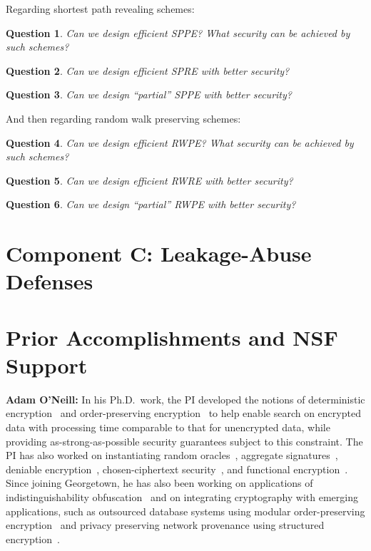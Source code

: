 \documentclass[11pt]{article}
\newtheorem{question}{Question}[section]
\theoremstyle{remark}
\begin{document}
Regarding shortest path revealing schemes: 

\begin{question}
Can we design efficient SPPE?  What security can be achieved by such schemes?
\end{question}


\begin{question}
Can we design efficient SPRE with better security?
\end{question}

\begin{question}
Can we design ``partial'' SPPE with better security?
\end{question}

And then regarding random walk preserving schemes:

\begin{question}
Can we design efficient RWPE?  What security can be achieved by such schemes?
\end{question}


\begin{question}
Can we design efficient RWRE with better security?
\end{question}

\begin{question}
Can we design ``partial'' RWPE with better security?
\end{question}




\section{Component C: Leakage-Abuse Defenses}


\section{Prior Accomplishments and NSF Support}

\textbf{Adam O'Neill:}
In his Ph.D.~work, the PI  developed the notions of deterministic encryption~\cite{C:BelBolOne07,ABO07,C:BolFehOne08,C:BFOR08,TCC:FulNeiRey12} and order-preserving encryption~\cite{EC:BCLO09,C:BolCheOne11} to help enable search on encrypted data with processing time comparable to that for unencrypted data, while providing as-strong-as-possible security guarantees subject to this constraint.
The PI has also worked on  instantiating random oracles~\cite{C:KilOneSmi10,TCC:GoyONeRao11,EC:LewONeSmi13},   aggregate signatures~\cite{CCS:BGOY07,AC:GLOW12}, deniable encryption~\cite{C:OnePeiWat11},  chosen-ciphertext security~\cite{EC:KilMohOne10,PKC:DFMO14}, and  functional encryption~\cite{EPRINT:ONeill10b,C:DIJOPP13, CANS:BelONe13}.   %
Since joining Georgetown, he has also been working on  applications of indistinguishability obfuscation~\cite{DGLOZ14} and on integrating cryptography with emerging applications, such as outsourced database systems using modular order-preserving encryption~\cite{SIGMOD:MCOKC15} and  privacy preserving network provenance using structured encryption~\cite{LOSZZ14}.
\end{document}
